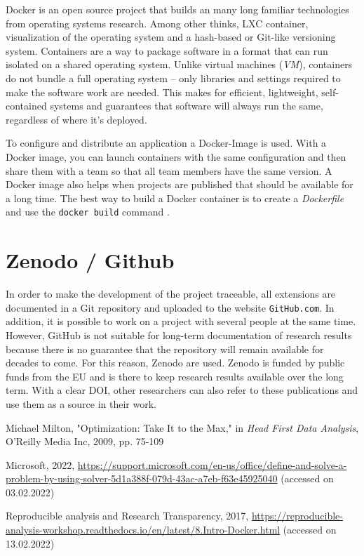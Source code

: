 \documentclass{article}
\begin{document}
\begin{multicols}{2}
Docker is an open source project that builds an many long familiar technologies from operating systems research. Among other thinks, LXC container, visualization of the operating system and a hash-based or Git-like versioning system. Containers are a way to package software in a format that can run isolated on a shared operating system. Unlike virtual machines (\textit{VM}), containers do not bundle a full operating system -- only libraries and settings required to make the software work are needed. This makes for efficient, lightweight, self-contained systems and guarantees that software will always run the same, regardless of where it's deployed. 

To configure and distribute an application a Docker-Image is used. With a Docker image, you can launch containers with the same configuration and then share them with a team so that all team members have the same version. A Docker image also helps when projects are published that should be available for a long time. The best way to build a Docker container is to create a \textit{Dockerfile} and use the \texttt{docker build} command \cite{Docker}.

\section{Zenodo / Github}
In order to make the development of the project traceable, all extensions are documented in a Git repository and uploaded to the website \texttt{GitHub.com}. In addition, it is possible to work on a project with several people at the same time. However, GitHub is not suitable for long-term documentation of research results because there is no guarantee that the repository will remain available for decades to come. For this reason, Zenodo are used.
Zenodo is funded by public funds from the EU and is there to keep research results available over the long term. With a clear DOI, other researchers can also refer to these publications and use them as a source in their work.


\begin{thebibliography}{2}
  Michael Milton, "Optimization: Take It to the Max," in  \textit{Head First Data Analysis}, O'Reilly Media Inc, 2009, pp. 75-109
 
  Microsoft, 2022, \url{https://support.microsoft.com/en-us/office/define-and-solve-a-problem-by-using-solver-5d1a388f-079d-43ac-a7eb-f63e45925040} (accessed on 03.02.2022)

  Reproducible analysis and Research Transparency, 2017, \url{https://reproducible-analysis-workshop.readthedocs.io/en/latest/8.Intro-Docker.html} (accessed on 13.02.2022)
\end{thebibliography}


\end{multicols}
\end{document}
